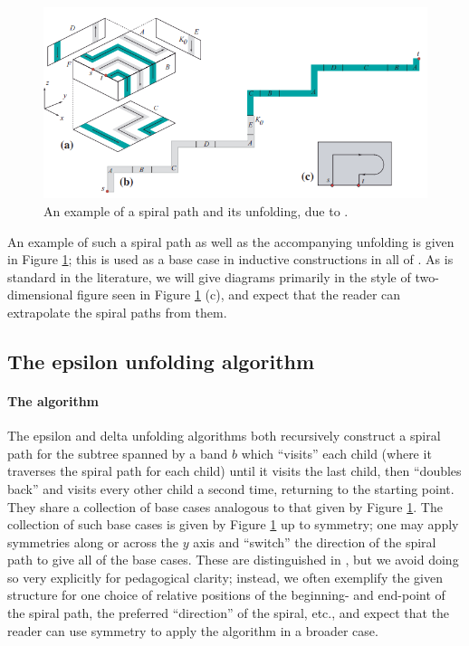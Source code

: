 \documentclass{article}
\begin{document}
\begin{figure}
  \begin{center}
    \includegraphics[width=\textwidth]{./figs/New_diagram_who_dis.png}
  \end{center}
  \caption{
    An example of a spiral path and its unfolding, due to \cite[Fig. 3]{Damian_Flatland_Orourke}.
  }\label{Box spiral figure}
\end{figure}

An example of such a spiral path as well as the accompanying unfolding is given in Figure \ref{Box spiral figure};
this is used as a base case in inductive constructions in all of \cite{Damian_Flatland_Orourke,Damian_Demaine,Damian_Demaine_Flatland,Chang_Yen}.
As is standard in the literature, we will give diagrams primarily in the style of two-dimensional figure seen in Figure \ref{Box spiral figure} (c), and expect that the reader can extrapolate the spiral paths from them. 



\subsection{The epsilon unfolding algorithm}\label{Nonlinear epsilon subsection}
\paragraph{The algorithm}
The epsilon and delta unfolding algorithms both recursively construct a spiral path for the subtree spanned by a band $b$ which ``visits'' each child (where it traverses the spiral path for each child) until it visits the last child, then ``doubles back'' and visits every other child a second time, returning to the starting point.
They share a collection of base cases analogous to that given by Figure \ref{Box spiral figure}.
The collection of such base cases is given by Figure \ref{Box spiral figure} up to symmetry; one may apply symmetries along or across the $y$ axis and ``switch'' the direction of the spiral path to give all of the base cases. 
These are distinguished in \cite{Damian_Flatland_Orourke,Damian_Demaine,Damian_Demaine_Flatland,Chang_Yen}, but we avoid doing so very explicitly for pedagogical clarity;
instead, we often exemplify the given structure for one choice of relative positions of the beginning- and end-point of the spiral path, the preferred ``direction'' of the spiral, etc., and expect that the reader can use symmetry to apply the algorithm in a broader case.\cite{Damian_Flatland_Orourke,Damian_Demaine,Damian_Demaine_Flatland,Chang_Yen}
\end{document}
